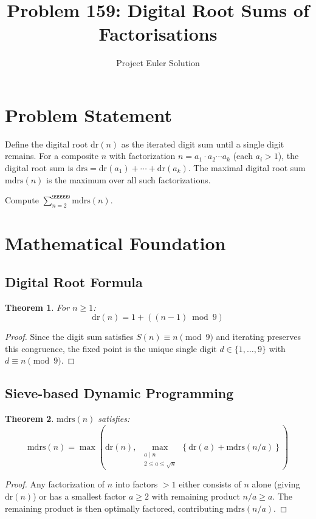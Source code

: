 \documentclass[12pt,a4paper]{article}
\title{Problem 159: Digital Root Sums of Factorisations}
\author{Project Euler Solution}
\date{}
\newtheorem{theorem}{Theorem}
\theoremstyle{definition}
\begin{document}
\maketitle

\section{Problem Statement}

Define the digital root $\mathrm{dr}(n)$ as the iterated digit sum until a single digit remains. For a composite $n$ with factorization $n = a_1 \cdot a_2 \cdots a_k$ (each $a_i > 1$), the digital root sum is $\mathrm{drs} = \mathrm{dr}(a_1) + \cdots + \mathrm{dr}(a_k)$. The maximal digital root sum $\mathrm{mdrs}(n)$ is the maximum over all such factorizations.

Compute $\displaystyle\sum_{n=2}^{999999} \mathrm{mdrs}(n)$.

\section{Mathematical Foundation}

\subsection{Digital Root Formula}

\begin{theorem}
For $n \ge 1$:
\[
\mathrm{dr}(n) = 1 + ((n-1) \bmod 9)
\]
\end{theorem}

\begin{proof}
Since the digit sum satisfies $S(n) \equiv n \pmod{9}$ and iterating preserves this congruence, the fixed point is the unique single digit $d \in \{1, \ldots, 9\}$ with $d \equiv n \pmod{9}$.
\end{proof}

\subsection{Sieve-based Dynamic Programming}

\begin{theorem}
$\mathrm{mdrs}(n)$ satisfies:
\[
\mathrm{mdrs}(n) = \max\!\left(\mathrm{dr}(n),\; \max_{\substack{a \mid n \\ 2 \le a \le \sqrt{n}}} \left\{\mathrm{dr}(a) + \mathrm{mdrs}(n/a)\right\}\right)
\]
\end{theorem}

\begin{proof}
Any factorization of $n$ into factors $> 1$ either consists of $n$ alone (giving $\mathrm{dr}(n)$) or has a smallest factor $a \ge 2$ with remaining product $n/a \ge a$. The remaining product is then optimally factored, contributing $\mathrm{mdrs}(n/a)$.
\end{proof}
\end{document}
